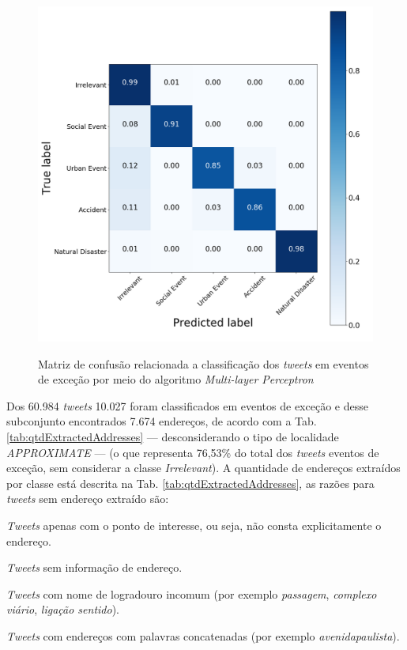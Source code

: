 \documentclass[
	12pt,				%
	oneside,			%
	a4paper,			%
	english,			%
	brazil				%
	]{abntex2ppgsi}
\begin{document}
\begin{figure}[!htb]
	\centering
 	  \caption{Matriz de confusão relacionada a classificação dos \textit{tweets} em eventos de exceção por meio do algoritmo \textit{Multi-layer Perceptron}}
		\includegraphics[width=1\linewidth]{images/confusion_matrix_mlpc.png}
	\label{fig:confusion_matrix_mlpc}
\end{figure}

Dos 60.984 \textit{tweets} 10.027 foram classificados em eventos de exceção e desse subconjunto encontrados 7.674 endereços, de acordo com a Tab. \ref{tab:qtdExtractedAddresses} --- desconsiderando o tipo de localidade \textit{APPROXIMATE} --- (o que representa 76,53\% do total dos \textit{tweets} eventos de exceção, sem considerar a classe \textit{Irrelevant}). A quantidade de endereços extraídos por classe está descrita na Tab. \ref{tab:qtdExtractedAddresses}, as razões para \textit {tweets} sem endereço extraído são:

\begin{enumerate*}
\item \textit{Tweets} apenas com o ponto de interesse, ou seja, não consta explicitamente o endereço.
\item \textit{Tweets} sem informação de endereço.
\item \textit{Tweets} com nome de logradouro incomum (por exemplo \emph{passagem}, \emph{complexo viário}, \emph{ligação sentido}).
\item \textit{Tweets} com endereços com palavras concatenadas (por exemplo \emph{avenidapaulista}).
\end{enumerate*}
\end{document}
